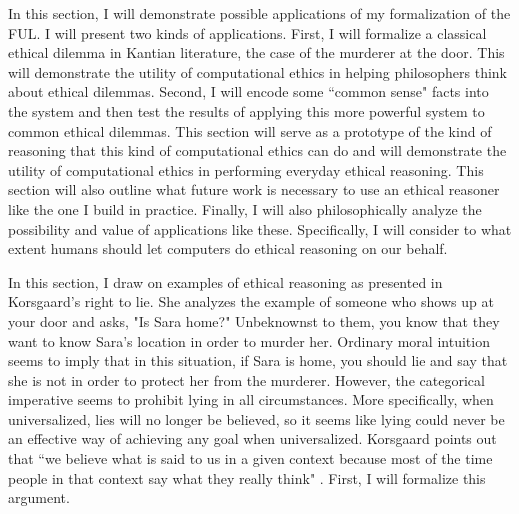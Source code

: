 %
\begin{isabellebody}%
%
%
\isadelimtheory
%
\endisadelimtheory
%
\isatagtheory
%
\endisatagtheory
{\isafoldtheory}%
%
\isadelimtheory
%
\endisadelimtheory
%
\isadelimdocument
%
\endisadelimdocument
%
\isatagdocument
%
\isamarkuptrue%
%
\endisatagdocument
{\isafolddocument}%
%
\isadelimdocument
%
\endisadelimdocument
%
\begin{isamarkuptext}%
In this section, I will demonstrate possible applications of my formalization of the FUL. I 
will present two kinds of applications. First, I will formalize a classical ethical dilemma in 
Kantian literature, the case of the murderer at the door. This will demonstrate the utility of computational
ethics in helping philosophers think about ethical dilemmas. Second, I will encode some ``common sense"
facts into the system and then test the results of applying this more powerful system to common
ethical dilemmas. This section will serve as a prototype of the kind of reasoning that this kind of 
computational ethics can do and will demonstrate the utility of computational ethics in performing 
everyday ethical reasoning. This section will also outline what future work is necessary to use an 
ethical reasoner like the one I build in practice. Finally, I will also philosophically analyze the possibility and value of 
applications like these. Specifically, I will consider to what extent humans should let computers do 
ethical reasoning on our behalf.%
\end{isamarkuptext}\isamarkuptrue%
%
\isadelimdocument
%
\endisadelimdocument
%
\isatagdocument
%
\isamarkuptrue%
%
\endisatagdocument
{\isafolddocument}%
%
\isadelimdocument
%
\endisadelimdocument
%
\begin{isamarkuptext}%
In this section, I draw on examples of ethical reasoning as presented in Korsgaard's right to lie.
She analyzes the example of someone who shows up at your door and asks, "Is Sara home?" Unbeknownst to them, 
you know that they want to know Sara's location in order to murder her. Ordinary moral intuition seems
to imply that in this situation, if Sara is home, you should lie and say that she is not in order to 
protect her from the murderer. However, the categorical imperative seems to prohibit lying in all 
circumstances. More specifically, when universalized, lies will no longer be believed, so it seems 
like lying could never be an effective way of achieving any goal when universalized. Korsgaard points out
that ``we believe what is said to us in a given context because most of the time people in that context 
say what they really think" \citep[4]{KorsgaardRTL}. First, I will formalize this argument.


\end{isamarkuptext}
\end{isabellebody}
